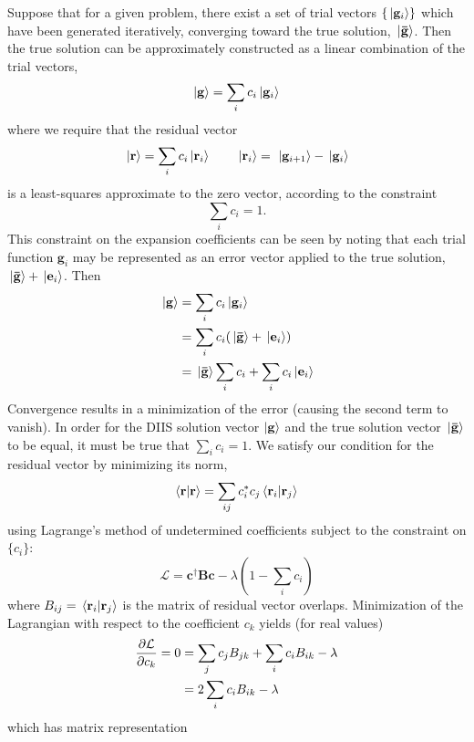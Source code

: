 \documentclass[11pt]{article}
\begin{document}
Suppose that for a given problem, there exist a set of trial vectors $\qty{\ket*{\mathbf{g}_i}}$ which have been generated iteratively, converging toward the true solution, $\ket*{\mathbf{\bar{g}}}$.  Then the true solution can be approximately constructed as a linear combination of the trial vectors,
$$ \ket{\mathbf{g}} = \sum_i c_i\ket*{\mathbf{g}_i} $$
where we require that the residual vector 
$$ \ket*{\mathbf{r}} = \sum_ic_i \ket*{\mathbf{r}_i} \qquad \ket*{\mathbf{r}_i} 
=\, \ket*{\mathbf{g}_{i+1}} - \ket*{\mathbf{g}_i}$$
is a least-squares approximate to the zero vector, according to the constraint
$$\sum_i c_i = 1.$$
This constraint on the expansion coefficients can be seen by noting that each trial function ${ \mathbf{g}}_i$ may be represented as an error vector applied to the true solution, $\ket*{\mathbf{\bar{g}}} + \ket*{\mathbf{e}_i}$.  Then
\begin{align}
\ket*{\mathbf{g}} &= \sum_ic_i\ket*{\mathbf{g}_i}\\
&= \sum_i c_i(\ket*{\mathbf{\bar{g}}} + \ket*{\mathbf{e}_i})\\
&= \ket*{\mathbf{\bar{g}}}\sum_i c_i + \sum_i c_i\ket*{\mathbf{e}_i}
\end{align}
Convergence results in a minimization of the error (causing the second term to vanish). In order for the DIIS solution vector $\ket{\mathbf{g}}$ and the true solution vector $\ket*{\mathbf{\bar{g}}}$ to be equal, it must be true that $\sum_i c_i = 1$.  We satisfy our condition for the residual vector by minimizing its norm,
$$ \ip{\mathbf{r}}{\mathbf{r}} = \sum_{ij} c_i^* c_j \ip*{\mathbf{r}_i}{\mathbf{r}_j} $$
using Lagrange's method of undetermined coefficients subject to the constraint on $\{c_i\}$:
$${\mathcal{L}} = {\mathbf{c}}^{\dagger}{\mathbf{Bc}} - \lambda\left(1 - \sum_i c_i\right)$$
where $B_{ij} = \ip*{\mathbf{r}_i }{\mathbf{r}_j} $ is the matrix of residual vector overlaps.  Minimization of the Lagrangian with respect to the coefficient $c_k$ yields (for real values)
\begin{align}
\pdv{\mathcal{L}}{c_k} = 0 &= \sum_j c_j B_{jk} + \sum_i c_i B_{ik} - \lambda\\
&= 2\sum_ic_iB_{ik} - \lambda
\end{align}
which has matrix representation
\end{document}
